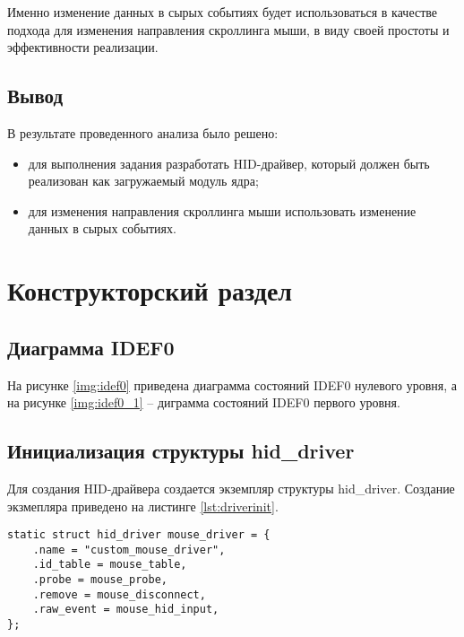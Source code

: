 \documentclass{bmstu}
\begin{document}
Именно изменение данных в сырых событиях будет использоваться в качестве подхода для изменения направления скроллинга мыши, в виду своей простоты и эффективности реализации.

\section{Вывод}
В результате проведенного анализа было решено:
\begin{itemize}
	\item для выполнения задания разработать HID-драйвер, который должен быть реализован как загружаемый модуль ядра;
	\item для изменения направления скроллинга мыши использовать изменение данных в сырых событиях.
\end{itemize}

\clearpage

\chapter{Конструкторский раздел}

\section{Диаграмма IDEF0}

На рисунке \ref{img:idef0} приведена диаграмма состояний IDEF0 нулевого уровня,
а на рисунке \ref{img:idef0_1} -- диграмма состояний IDEF0 первого уровня.


\section{Инициализация структуры hid\_driver}

Для создания HID-драйвера создается экземпляр структуры hid\_driver.
Создание экзмепляра приведено на листинге \ref{lst:driverinit}.

\clearpage
\begin{lstlisting}[caption={Инициализация структуры hid\_driver}, label=lst:driverinit]
static struct hid_driver mouse_driver = {
    .name = "custom_mouse_driver",
    .id_table = mouse_table,
    .probe = mouse_probe,
    .remove = mouse_disconnect,
    .raw_event = mouse_hid_input,
};
\end{lstlisting}
\end{document}
